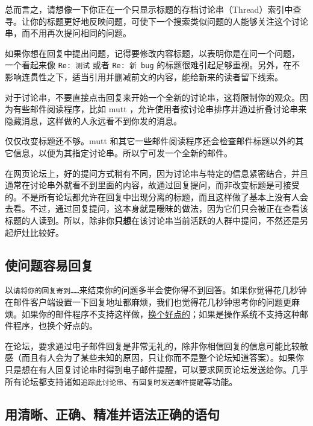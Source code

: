 \documentclass[titlepage]{article}
\begin{document}
总而言之，请想像一下你正在一个只显示标题的存档讨论串（Thread）索引中查寻。让你的标题更好地反映问题，可使下一个搜索类似问题的人能够关注这个讨论串，而不用再次提问相同的问题。

如果你想在回复中提出问题，记得要修改内容标题，以表明你是在问一个问题，
一个看起来像 \texttt{Re:\ 测试} 或者 \texttt{Re:\ 新\ bug}
的标题很难引起足够重视。另外，在不影响连贯性之下，适当引用并删减前文的内容，能给新来的读者留下线索。

对于讨论串，不要直接点击回复来开始一个全新的讨论串，这将限制你的观众。因为有些邮件阅读程序，比如
mutt
，允许使用者按讨论串排序并通过折叠讨论串来隐藏消息，这样做的人永远看不到你发的消息。

仅仅改变标题还不够。mutt
和其它一些邮件阅读程序还会检查邮件标题以外的其它信息，以便为其指定讨论串。所以宁可发一个全新的邮件。

在网页论坛上，好的提问方式稍有不同，因为讨论串与特定的信息紧密结合，并且通常在讨论串外就看不到里面的内容，故通过回复提问，而非改变标题是可接受的。不是所有论坛都允许在回复中出现分离的标题，而且这样做了基本上没有人会去看。不过，通过回复提问，这本身就是暧昧的做法，因为它们只会被正在查看该标题的人读到。所以，除非你\textbf{只想}在该讨论串当前活跃的人群中提问，不然还是另起炉灶比较好。

\hypertarget{ux4f7fux95eeux9898ux5bb9ux6613ux56deux590d}{\subsection{使问题容易回复}\label{ux4f7fux95eeux9898ux5bb9ux6613ux56deux590d}}

以\texttt{请将你的回复寄到\ldots{}\ldots{}}来结束你的问题多半会使你得不到回答。如果你觉得花几秒钟在邮件客户端设置一下回复地址都麻烦，我们也觉得花几秒钟思考你的问题更麻烦。如果你的邮件程序不支持这样做，\href{http://linuxmafia.com/faq/Mail/muas.html}{换个好点的}；如果是操作系统不支持这种邮件程序，也换个好点的。

在论坛，要求通过电子邮件回复是非常无礼的，除非你相信回复的信息可能比较敏感（而且有人会为了某些未知的原因，只让你而不是整个论坛知道答案）。如果你只是想在有人回复讨论串时得到电子邮件提醒，可以要求网页论坛发送给你。几乎所有论坛都支持诸如\texttt{追踪此讨论串}、\texttt{有回复时发送邮件提醒}等功能。

\subsection{用清晰、正确、精准并语法正确的语句}\label{ux7528ux6e05ux6670ux6b63ux786eux7cbeux51c6ux5e76ux8bedux6cd5ux6b63ux786eux7684ux8bedux53e5}
\end{document}
